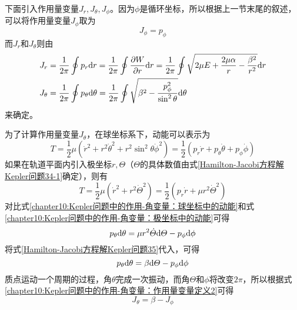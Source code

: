 下面引入作用量变量$J_r, J_\theta, J_\phi$。因为$\phi$是循环坐标，所以根据上一节末尾的叙述，可以将作用量变量$J_\phi$取为
\begin{equation}
	J_\phi = p_\phi
\end{equation}
而$J_r$和$J_\theta$则由
\begin{align}
	J_r & = \frac{1}{2\pi} \oint p_r\mathrm{d} r = \frac{1}{2\pi} \oint \frac{\partial W}{\partial r} \mathrm{d} r = \frac{1}{2\pi} \oint \sqrt{2\mu E+\frac{2\mu\alpha}{r}-\frac{\beta^2}{r^2}} \mathrm{d} r \label{chapter10:Kepler问题中的作用-角变量：作用量变量定义1} \\
	J_\theta & = \frac{1}{2\pi} \oint p_\theta\mathrm{d} \theta = \frac{1}{2\pi} \oint \sqrt{\beta^2-\frac{p_\phi^2}{\sin^2\theta}} \mathrm{d} \theta \label{chapter10:Kepler问题中的作用-角变量：作用量变量定义2}
\end{align}
来确定。

为了计算作用量变量$J_\theta$，在球坐标系下，动能可以表示为
\begin{equation}
	T = \frac12\mu\left(\dot{r}^2 + r^2\dot{\theta}^2 + r^2\sin^2\theta\dot{\phi}^2\right) = \frac12 \left(p_r\dot{r} + p_\theta\dot{\theta} + p_\phi\dot{\phi}\right)
	\label{chapter10:Kepler问题中的作用-角变量：球坐标中的动能}
\end{equation}
如果在轨道平面内引入极坐标$r, \varTheta$（$\varTheta$的具体数值由式\eqref{Hamilton-Jacobi方程解Kepler问题34-1}确定），则有
\begin{equation}
	T = \frac12\mu\left(\dot{r}^2 + r^2\dot{\varTheta}^2\right) = \frac12\left(p_r\dot{r} + \mu r^2\dot{\varTheta}^2\right)
	\label{chapter10:Kepler问题中的作用-角变量：极坐标中的动能}
\end{equation}
对比式\eqref{chapter10:Kepler问题中的作用-角变量：球坐标中的动能}和式\eqref{chapter10:Kepler问题中的作用-角变量：极坐标中的动能}可得
\begin{equation}
	p_\theta\mathrm{d} \theta = \mu r^2\dot{\varTheta}\mathrm{d} \varTheta - p_\phi\mathrm{d} \phi
\end{equation}
将式\eqref{Hamilton-Jacobi方程解Kepler问题35}代入，可得
\begin{equation}
	p_\theta\mathrm{d} \theta = \beta\mathrm{d} \varTheta - p_\phi\mathrm{d} \phi
\end{equation}
质点运动一个周期的过程，角$\theta$完成一次振动，而角$\varTheta$和$\phi$将改变$2\pi$，所以根据式\eqref{chapter10:Kepler问题中的作用-角变量：作用量变量定义2}可得
\begin{equation}
	J_\theta = \beta - J_\phi
	\label{chapter10:Kepler问题中的作用-角变量：作用量变量J_theta}
\end{equation}

